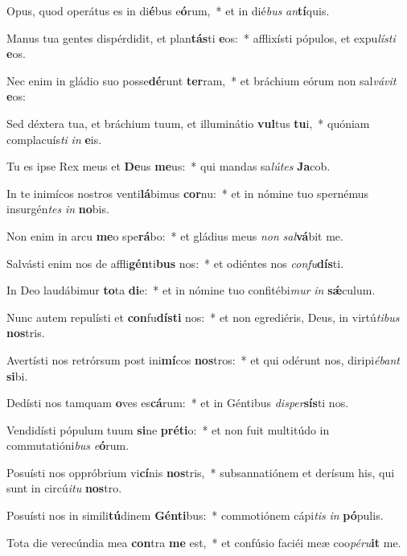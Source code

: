 \item Opus, quod operátus es in di\textbf{é}bus e\textbf{ó}rum,~* et in dié\textit{bus} \textit{an}\textbf{tí}quis.
\item Manus tua gentes dispérdidit, et plan\textbf{tás}ti \textbf{e}os:~* afflixísti pópulos, et expu\textit{lís}\textit{ti} \textbf{e}os.
\item Nec enim in gládio suo posse\textbf{dé}runt \textbf{ter}ram,~* et bráchium eórum non sal\textit{vá}\textit{vit} \textbf{e}os:
\item Sed déxtera tua, et bráchium tuum, et illuminátio \textbf{vul}tus \textbf{tu}i,~* quóniam complacuís\textit{ti} \textit{in} \textbf{e}is.
\item Tu es ipse Rex meus et \textbf{De}us \textbf{me}us:~* qui mandas sa\textit{lú}\textit{tes} \textbf{Ja}cob.
\item In te inimícos nostros venti\textbf{lá}bimus \textbf{cor}nu:~* et in nómine tuo spernémus insurgén\textit{tes} \textit{in} \textbf{no}bis.
\item Non enim in arcu \textbf{me}o spe\textbf{rá}bo:~* et gládius meus \textit{non} \textit{sal}\textbf{vá}bit me.
\item Salvásti enim nos de affli\textbf{gén}ti\textbf{bus} nos:~* et odiéntes nos \textit{con}\textit{fu}\textbf{dís}ti.
\item In Deo laudábimur \textbf{to}ta \textbf{di}e:~* et in nómine tuo confitébi\textit{mur} \textit{in} \textbf{sǽ}culum.
\item Nunc autem repulísti et \textbf{con}fu\textbf{dís}\textbf{ti} nos:~* et non egrediéris, Deus, in virtú\textit{ti}\textit{bus} \textbf{nos}tris.
\item Avertísti nos retrórsum post ini\textbf{mí}cos \textbf{nos}tros:~* et qui odérunt nos, diripi\textit{é}\textit{bant} \textbf{si}bi.
\item Dedísti nos tamquam \textbf{o}ves es\textbf{cá}rum:~* et in Géntibus \textit{di}\textit{sper}\textbf{sís}ti nos.
\item Vendidísti pópulum tuum \textbf{si}ne \textbf{pré}\textbf{ti}o:~* et non fuit multitúdo in commutatióni\textit{bus} \textit{e}\textbf{ó}rum.
\item Posuísti nos oppróbrium vi\textbf{cí}nis \textbf{nos}tris,~* subsannatiónem et derísum his, qui sunt in circú\textit{i}\textit{tu} \textbf{nos}tro.
\item Posuísti nos in simili\textbf{tú}dinem \textbf{Gén}\textbf{ti}bus:~* commotiónem cápi\textit{tis} \textit{in} \textbf{pó}pulis.
\item Tota die verecúndia mea \textbf{con}tra \textbf{me} est,~* et confúsio faciéi meæ coo\textit{pé}\textit{ru}\textbf{it} me.
